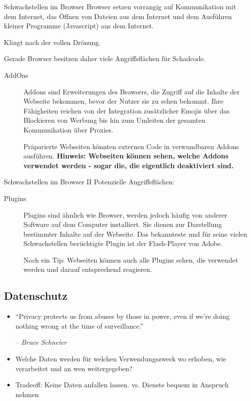 \documentclass[utf8]{beamer}
\begin{document}
	\begin{frame}{Schwachstellen im Browser}
		Browser setzen vorrangig auf Kommunikation mit dem Internet, das Öffnen von Dateien aus dem Internet und dem Ausführen kleiner Programme (Javascript) aus dem Internet.
		
		Klingt nach der vollen Drönung.
		
		Gerade Browser besitzen daher viele Angriffsflächen für Schadcode. 
		\begin{description}
			\item[AddOns] {Addons sind Erweiterungen des Browsers, die Zugriff auf die Inhalte der Webseite bekommen, bevor der Nutzer sie zu sehen bekommt. Ihre Fähigkeiten reichen von der Integration zusätzlicher Emojis über das Blockieren von Werbung bis hin zum Umleiten der gesamten Kommunikation über Proxies. 
			
			Präparierte Webseiten könnten externen Code in verwundbaren Addons ausführen. \textbf{Hinweis: Webseiten können sehen, welche Addons verwendet werden - sogar die, die eigentlich deaktiviert sind.}}
		\end{description}
	\end{frame}

\begin{frame}{Schwachstellen im Browser II}
	Potenzielle Angriffsflächen:
	\begin{description}
		\item[Plugins] {Plugins sind ähnlich wie Browser, werden jedoch häufig von anderer Software auf dem Computer installiert. Sie dienen zur Darstellung bestimmter Inhalte auf der Webseite. Das bekannteste und für seine vielen Schwachstellen berüchtigte Plugin ist der Flash-Player von Adobe.
		
		Noch ein Tip: Webseiten können auch alle Plugins sehen, die verwendet werden und darauf entsprechend reagieren.}
	\end{description}
\end{frame}
	
	\subsection{Datenschutz}
	\begin{frame} 
		\begin{itemize}
			\item{\enquote{Privacy protects us from abuses by those in power, even if we’re doing nothing wrong at the time of surveillance.}
				
			-- \emph{Bruce Schneier}}
			\item Welche Daten werden für welchen Verwendungszweck wo erhoben, wie verarbeitet und an wen weitergegeben?
			\item Tradeoff: Keine Daten anfallen lassen. vs. Dienste bequem in Anspruch nehmen
		\end{itemize}
	\end{frame}
	
\end{document}
